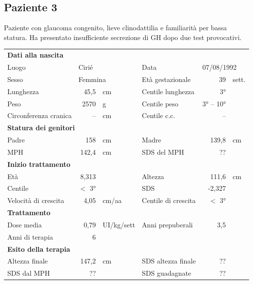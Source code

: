 \clearpage

\subsection*{Paziente 3}%

Paziente con glaucoma congenito, lieve clinodattilia e familiarità per bassa statura. Ha presentato insufficiente secrezione di GH  dopo due test provocativi.


\begin{table}[!h]
\begin{tabular}{lrllrl}
\toprule
\multicolumn{6}{l}{\textbf{Dati alla nascita}}\\
Luogo 		& \multicolumn{2}{l}{Cirié} 	& Data 					& \multicolumn{2}{l}{07/08/1992} 	\\
Sesso 		& \multicolumn{2}{l}{Femmina} 	& Età gestazionale 		& 39 		& sett.\\
Lunghezza 	& 45,5 		& cm 				& Centile lunghezza		& 3° 		\\
Peso 		& 2570 		& g					& Centile peso			& 3° -- 10° 		\\
Circonferenza cranica	& -- 		& cm 	& Centile c.c.			& -- \\
\midrule
\multicolumn{6}{l}{\textbf{Statura dei genitori}}\\
Padre 		& 158 & cm 		& Madre 				& 139,8 & cm \\
MPH 		& 142,4 & cm 	& SDS del MPH 			& ?? \\
\midrule
\multicolumn{6}{l}{\textbf{Inizio trattamento}} \\
Età	& 8,313 & 		& Altezza 				& 111,6 & cm  \\
Centile & $<$ 3° 	 &		& SDS		& -2,327 \\
Velocità di crescita & 4,05 & cm/aa	& Centile di crescita & $<$ 3°\\
\midrule
\multicolumn{6}{l}{\textbf{Trattamento}} \\
Dose media		& 0,79 & UI/kg/sett & Anni prepuberali & 3,5\\
Anni di terapia & 6\\
\midrule
\multicolumn{6}{l}{\textbf{Esito della terapia}} \\
Altezza finale	& 147,2 & cm 	& SDS altezza finale 	& ??\\
SDS dal MPH	& ?? 	&		& SDS guadagnate 			& ??\\
\bottomrule
\end{tabular}
\end{table}
\clearpage

